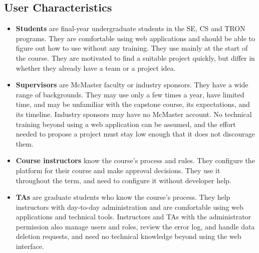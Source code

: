 \documentclass[12pt]{article}
\begin{document}
  \subsection{User Characteristics} \label{SecUserCharacteristics}


  \begin{itemize}
    \item \textbf{Students} are final-year undergraduate students in the SE, CS and TRON programs.
    They are comfortable using web applications and should be able to figure out how to use
    \projname{} without any training. They use \projname{} mainly at the start of the
    course. They are motivated to find a suitable project quickly, but
    differ in whether they already have a team or a project idea.
    \item \textbf{Supervisors} are McMaster faculty or industry sponsors. They have a wide range of
    backgrounds. They may use \projname{} only a few times a year, have limited time, and may be
    unfamiliar with the capstone course, its expectations, and its timeline. Industry sponsors may have
    no McMaster account. No technical training beyond using a web application can be assumed, and
    the effort needed to propose a project must stay low enough that it does not discourage them.
    \item \textbf{Course instructors} know the course's process and rules. They configure the
    platform for their course and make approval decisions. They use it throughout the term, and need
    to configure it without developer help.
    \item \textbf{TAs} are graduate students who know the course's process. They
    help instructors with day-to-day administration and are comfortable using web applications and
    technical tools. Instructors and TAs with the administrator permission also manage users and roles, review the
    error log, and handle data deletion requests, and need no technical knowledge beyond using the web interface.
  \end{itemize}
\end{document}
